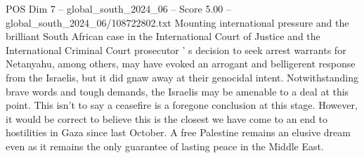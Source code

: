 \begin{textsample}{POS Dim 7 – global\_south\_2024\_06 – Score 5.00 – global\_south\_2024\_06/108722802.txt}
Mounting international pressure and the brilliant South African case in the International Court of Justice and the International Criminal Court prosecutor ' s decision to seek arrest warrants for Netanyahu, among others, may have evoked an arrogant and belligerent response from the Israelis, but it did gnaw away at their genocidal intent.
Notwithstanding brave words and tough demands, the Israelis may be amenable to a deal at this point.
This isn't to say a ceasefire is a foregone conclusion at this stage.
However, it would be correct to believe this is the closest we have come to an end to hostilities in Gaza since last October.
A free Palestine remains an elusive dream even as it remains the only guarantee of lasting peace in the Middle East.

\end{textsample}

